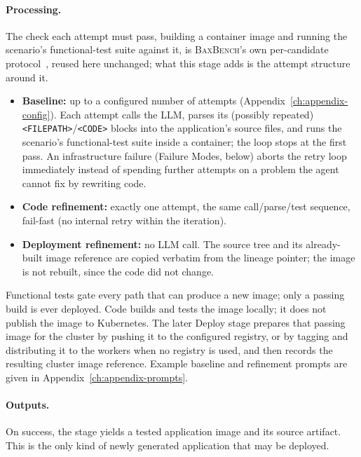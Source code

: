 \paragraph{Processing.}
The check each attempt must pass, building a container image and running
the scenario's functional-test suite against it, is \textsc{BaxBench}'s own
per-candidate protocol~\cite{vero2025baxbench}, reused here unchanged; what
this stage adds is the attempt structure around it.
\begin{itemize}
  \item \textbf{Baseline:} up to a configured number of attempts
        (Appendix~\ref{ch:appendix-config}). Each attempt calls the LLM,
        parses its (possibly repeated) \texttt{<FILEPATH>}/\texttt{<CODE>}
        blocks into the application's source files, and runs the
        scenario's functional-test suite inside a container; the loop stops
        at the first pass. An infrastructure failure (Failure Modes, below)
        aborts the retry loop immediately instead of spending further
        attempts on a problem the agent cannot fix by rewriting code.
  \item \textbf{Code refinement:} exactly one attempt, the same
        call/parse/test sequence, fail-fast (no internal retry within the
        iteration).
  \item \textbf{Deployment refinement:} no LLM call. The source tree and its
        already-built image reference are copied verbatim from the lineage
        pointer; the image is not rebuilt, since the code did not change.
\end{itemize}
Functional tests gate every path that can produce a new image; only a
passing build is ever deployed. Code builds and tests the image locally; it
does not publish the image to Kubernetes. The later Deploy stage prepares
that passing image for the cluster by pushing it to the configured registry,
or by tagging and distributing it to the workers when no registry is used,
and then records the resulting cluster image reference. Example baseline and
refinement prompts are given in Appendix~\ref{ch:appendix-prompts}.

\paragraph{Outputs.}
On success, the stage yields a tested application image and its source
artifact. This is the only kind of newly generated application that may be
deployed.

